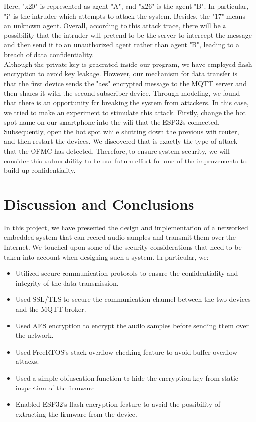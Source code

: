 \documentclass[conference]{IEEEtran}
\begin{document}
\newline  
Here, "x20" is represented as agent "A", and "x26" is the agent "B". In particular, "i" is the intruder which attempts to attack the system. Besides, the "17" means an unknown agent. Overall, according to this attack trace, there will be a possibility that the intruder will pretend to be the server to intercept the message and then send it to an unauthorized agent rather than agent "B", leading to a breach of data confidentiality.\\ 
Although the private key is generated inside our program, we have employed flash encryption to avoid key leakage. However, our mechanism for data transfer is that the first device sends the "aes" encrypted message to the MQTT server and then shares it with the second subscriber device. Through modeling, we found that there is an opportunity for breaking the system from attackers. In this case, we tried to make an experiment to stimulate this attack. Firstly, change the hot spot name on our smartphone into the wifi that the ESP32s connected. Subsequently, open the hot spot while shutting down the previous wifi router, and then restart the devices. We discovered that is exactly the type of attack that the OFMC has detected. Therefore, to ensure system security, we will consider this vulnerability to be our future effort for one of the improvements to build up confidentiality. 
     
\section{Discussion and Conclusions}
\label{sec:discussion_and_conclusions}

In this project, we have presented the design and implementation of a networked embedded system
that can record audio samples and transmit them over the Internet.
We touched upon some of the security considerations that need to be taken into account when designing such a system.
In particular, we:

\begin{itemize}
    \item Utilized secure communication protocols to ensure the confidentiality and integrity of the data transmission.
    \item Used SSL/TLS to secure the communication channel between the two devices and the MQTT broker.
    \item Used AES encryption to encrypt the audio samples before sending them over the network.
    \item Used FreeRTOS's stack overflow checking feature to avoid buffer overflow attacks.
    \item Used a simple obfuscation function to hide the encryption key from static inspection of the firmware.
    \item Enabled ESP32's flash encryption feature to avoid the possibility of extracting the firmware from the device.
\end{itemize}
\end{document}
